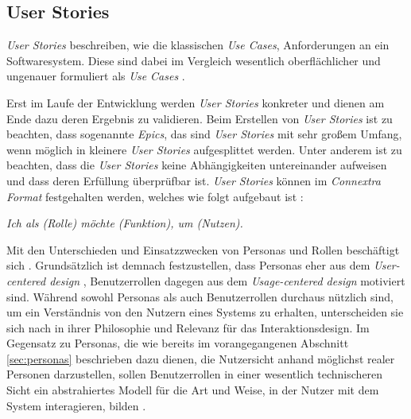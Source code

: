 \par
\endgroup

\subsection{User Stories}
\textit{User Stories} beschreiben, wie die klassischen \textit{Use Cases}, Anforderungen an ein Softwaresystem. Diese sind dabei im Vergleich wesentlich oberflächlicher und ungenauer formuliert als \textit{Use Cases} \citep{wirdemann2017scrum}.

Erst im Laufe der Entwicklung werden \textit{User Stories} konkreter und dienen am Ende dazu deren Ergebnis zu validieren. Beim Erstellen von \textit{User Stories} ist zu beachten, dass sogenannte \textit{Epics}, das sind \textit{User Stories} mit sehr großem Umfang, wenn möglich in kleinere \textit{User Stories} aufgesplittet werden. Unter anderem ist zu beachten, dass die \textit{User Stories} keine Abhängigkeiten untereinander aufweisen und dass deren Erfüllung überprüfbar ist. \textit{User Stories} können im \textit{Connextra Format} festgehalten werden, welches wie folgt aufgebaut ist \citep{cohn2004user}:

\par
\begingroup
\leftskip=1cm
\rightskip=1.5cm
\noindent

\textit{Ich als (Rolle) möchte (Funktion), um (Nutzen).}

\par
\endgroup

\vspace{.3cm}

Mit den Unterschieden und Einsatzzwecken von Personas und Rollen beschäftigt sich \cite{constantine2006users}. Grundsätzlich ist demnach festzustellen, dass Personas eher aus dem \textit{User-centered design} \citep{Norman1986user}, Benutzerrollen dagegen aus dem \textit{Usage-centered design} \citep{Constantine1996usage} motiviert sind. Während sowohl Personas als auch Benutzerrollen durchaus nützlich sind, um ein Verständnis von den Nutzern eines Systems zu erhalten, unterscheiden sie sich nach \cite{constantine2006users} in ihrer Philosophie und Relevanz für das Interaktionsdesign. Im Gegensatz zu Personas, die wie bereits im vorangegangenen Abschnitt \ref{sec:personas} beschrieben dazu dienen, die Nutzersicht anhand möglichst realer Personen darzustellen, sollen Benutzerrollen in einer wesentlich technischeren Sicht ein abstrahiertes Modell für die Art und Weise, in der Nutzer mit dem System interagieren, bilden \citep{constantine2006users}.

